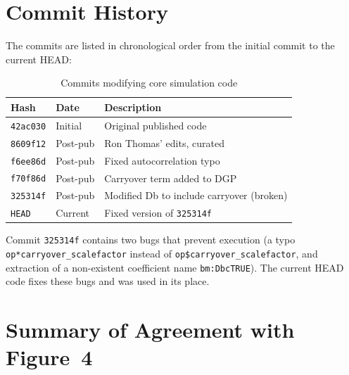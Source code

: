 \documentclass[11pt]{article}
\begin{document}
\section{Commit History}

The commits are listed in chronological order from the initial
commit to the current HEAD:

\begin{table}[h]
\centering
\caption{Commits modifying core simulation code}
\begin{tabular}{lll}
\toprule
Hash & Date & Description \\
\midrule
\texttt{42ac030} & Initial & Original published code \\
\texttt{8609f12} & Post-pub & Ron Thomas' edits, curated \\
\texttt{f6ee86d} & Post-pub & Fixed autocorrelation typo \\
\texttt{f70f86d} & Post-pub & Carryover term added to DGP \\
\texttt{325314f} & Post-pub & Modified Db to include carryover
  (broken) \\
\texttt{HEAD} & Current & Fixed version of \texttt{325314f} \\
\bottomrule
\end{tabular}
\end{table}

Commit \texttt{325314f} contains two bugs that prevent execution
(a typo \texttt{op*carryover\_scalefactor} instead of
\texttt{op\$carryover\_scalefactor}, and extraction of a
non-existent coefficient name \texttt{bm:DbcTRUE}). The current
HEAD code fixes these bugs and was used in its place.

\section{Summary of Agreement with Figure~4}
\end{document}
